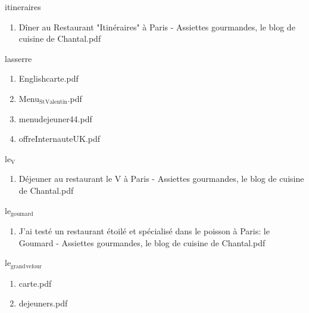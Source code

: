 \documentclass[11pt]{article}
\begin{document}

\item itineraires
\label{sec-1-1-1-1-21-10-3-6-5}
\begin{enumerate}
\item Dîner au Restaurant "Itinéraires" à Paris - Assiettes gourmandes, le blog de cuisine de Chantal.pdf
\label{sec-1-1-1-1-21-10-3-6-5-1}
\end{enumerate}

\item lasserre
\label{sec-1-1-1-1-21-10-3-6-6}
\begin{enumerate}
\item Englishcarte.pdf
\label{sec-1-1-1-1-21-10-3-6-6-1}

\item Menu$_{\text{St}}$$_{\text{Valentin}}$.pdf
\label{sec-1-1-1-1-21-10-3-6-6-2}

\item menudejeuner44.pdf
\label{sec-1-1-1-1-21-10-3-6-6-3}

\item offreInternauteUK.pdf
\label{sec-1-1-1-1-21-10-3-6-6-4}
\end{enumerate}

\item le$_{\text{V}}$
\label{sec-1-1-1-1-21-10-3-6-7}
\begin{enumerate}
\item Déjeuner au restaurant le V à Paris - Assiettes gourmandes, le blog de cuisine de Chantal.pdf
\label{sec-1-1-1-1-21-10-3-6-7-1}
\end{enumerate}

\item le$_{\text{goumard}}$
\label{sec-1-1-1-1-21-10-3-6-8}
\begin{enumerate}
\item J'ai testé un restaurant étoilé et spécialisé dans le poisson à Paris: le Goumard - Assiettes gourmandes, le blog de cuisine de Chantal.pdf
\label{sec-1-1-1-1-21-10-3-6-8-1}
\end{enumerate}

\item le$_{\text{grand}}$$_{\text{vefour}}$
\label{sec-1-1-1-1-21-10-3-6-9}
\begin{enumerate}
\item carte.pdf
\label{sec-1-1-1-1-21-10-3-6-9-1}

\item dejeuners.pdf
\label{sec-1-1-1-1-21-10-3-6-9-2}
\end{enumerate}
\end{document}
